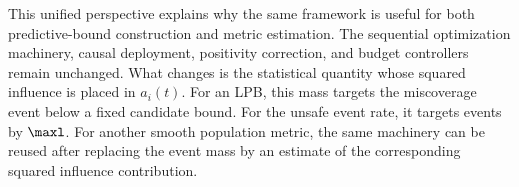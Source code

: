 This unified perspective explains why the same framework is useful for both
predictive-bound construction and metric estimation.  The sequential
optimization machinery, causal deployment, positivity correction, and budget
controllers remain unchanged.  What changes is the statistical quantity
whose squared influence is placed in $a_i(t)$.  For an LPB, this mass targets
the miscoverage event below a fixed candidate bound.  For the unsafe event
rate, it targets events by $\maxl$.  For another smooth population metric, the
same machinery can be reused after replacing the event mass by an estimate of
the corresponding squared influence contribution.

